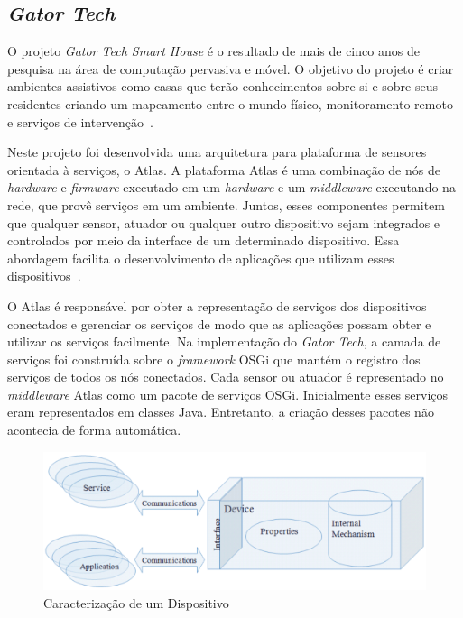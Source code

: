 \subsection{\emph{Gator Tech}}

O projeto \emph{Gator Tech Smart House} é o resultado de mais de cinco anos de pesquisa na área de computação pervasiva e móvel. O objetivo do projeto é criar ambientes assistivos como casas que terão conhecimentos sobre si e sobre seus residentes criando um mapeamento entre o mundo físico, monitoramento remoto e serviços de intervenção~\cite{gatorTech}.

Neste projeto foi desenvolvida uma arquitetura para plataforma de sensores orientada à serviços, o Atlas. A plataforma Atlas é uma combinação de nós de \emph{hardware} e \emph{firmware} executado em um \emph{hardware} e um \emph{middleware} executando na rede, que provê serviços em um ambiente. Juntos, esses componentes permitem que qualquer sensor, atuador ou qualquer outro dispositivo sejam integrados e controlados por meio da interface de um determinado dispositivo. Essa abordagem facilita o desenvolvimento de aplicações que utilizam esses dispositivos~\cite{gatorTechLessons}. 

O Atlas é responsável por obter a representação de serviços dos dispositivos conectados e gerenciar os serviços de modo que as aplicações possam obter e utilizar os serviços facilmente. Na implementação do \emph{Gator Tech}, a camada de serviços foi construída sobre o \emph{framework} OSGi que mantém o registro dos serviços de todos os nós conectados. Cada sensor ou atuador é representado no \emph{middleware} Atlas como um pacote de serviços OSGi. Inicialmente esses serviços eram representados em classes Java. Entretanto, a criação desses pacotes não acontecia de forma automática. 

\begin{figure}[ht]
\center
\includegraphics[scale=0.4]{imagens/gatorDDL}
\caption{Caracterização de um Dispositivo~\cite{ddlSpec}}
\label{fig:ddlspec}
\end{figure}

